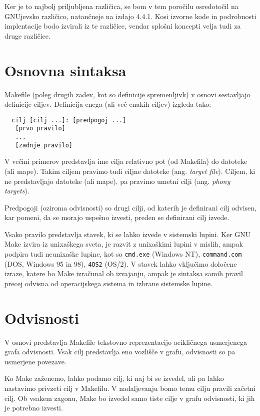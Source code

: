 \documentclass[notitlepage]{report}
\begin{document}
Ker je to najbolj priljubljena različica, se bom v tem poročilu
osredotočil na GNUjevsko različico, natančneje na izdajo 4.4.1. Kosi
izvorne kode in podrobnosti implentacije bodo izvirali iz te
različice, vendar splošni koncepti velja tudi za druge različice.

\section*{Osnovna sintaksa}

Makefile (poleg drugih zadev, kot so definicije spremenljivk) v osnovi
sestavljajo definicije ciljev. Definicija enega (ali več enakih
ciljev) izgleda tako:

\begin{verbatim}
  cilj [cilj ...]: [predpogoj ...]
   [prvo pravilo]
   ...
   [zadnje pravilo]
\end{verbatim}

V večini primerov predstavlja ime cilja relativno pot (od Makefila)
do datoteke (ali mape). Takim ciljem pravimo tudi ciljne datoteke
(ang. \textit{target file}). Ciljem, ki ne predstavljajo datoteke (ali
mape), pa pravimo umetni cilji (ang. \textit{phony targets}).

Predpogoji (oziroma odvisnosti) so drugi cilji, od katerih je
definirani cilj odvisen, kar pomeni, da se morajo uspešno izvesti,
preden se definirani cilj izvede.

Vsako pravilo predstavlja stavek, ki se lahko izvede v sistemski
lupini. Ker GNU Make izvira iz unixaškega sveta, je razvit z
unixaškimi lupini v mislih, ampak podpira tudi neunixaške lupine, kot
so \verb|cmd.exe| (Windows NT), \verb|command.com| (DOS, Windows 95 in
98), \verb|4OS2| (OS/2). V stavek lahko vključimo določene izraze,
katere bo Make izračunal ob izvajanju, ampak je sintaksa samih pravil
precej odvisna od operacijskega sistema in izbrane sistemske lupine.

\section*{Odvisnosti}

V osnovi predstavlja Makefile tekstovno reprezentacijo acikličnega
usmerjenega grafa odvisnosti. Vsak cilj predstavlja eno vozlišče v
grafu, odvisnosti so pa usmerjene povezave.

Ko Make zaženemo, lahko podamo cilj, ki naj bi se izvedel, ali pa
lahko nastavimo privzeti cilj v Makefilu. V nadaljevanju bomo temu
cilju pravili začetni cilj. Ob vsakem zagonu, Make bo izvedel samo
tiste cilje v grafu odvisnosti, ki jih je potrebno izvesti.
\end{document}
